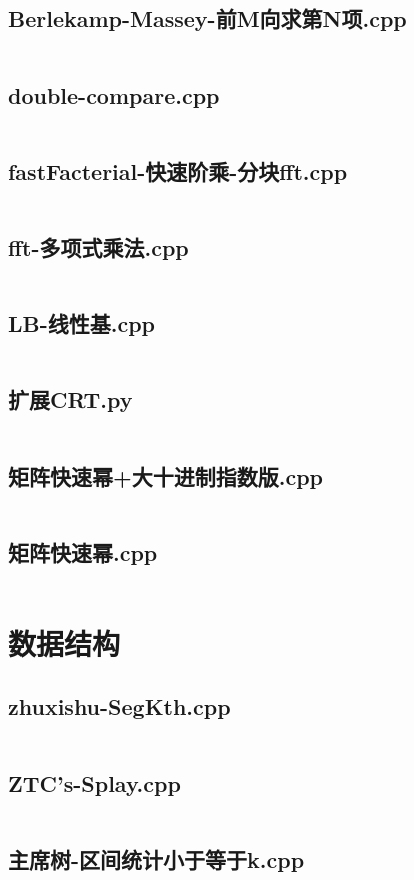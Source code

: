 \documentclass[a4paper,landscape,twocolumn]{article} %
\begin{document}
\subsection{Berlekamp-Massey-前M向求第N项.cpp}
\inputminted{c++}{./codes/030}
\subsection{double-compare.cpp}
\inputminted{c++}{./codes/031}
\subsection{fastFacterial-快速阶乘-分块fft.cpp}
\inputminted{c++}{./codes/032}
\subsection{fft-多项式乘法.cpp}
\inputminted{c++}{./codes/033}
\subsection{LB-线性基.cpp}
\inputminted{c++}{./codes/034}
\subsection{扩展CRT.py}
\inputminted{python}{./codes/035}
\subsection{矩阵快速幂+大十进制指数版.cpp}
\inputminted{c++}{./codes/036}
\subsection{矩阵快速幂.cpp}
\inputminted{c++}{./codes/037}
\section{数据结构}
\subsection{zhuxishu-SegKth.cpp}
\inputminted{c++}{./codes/038}
\subsection{ZTC's-Splay.cpp}
\inputminted{c++}{./codes/039}
\subsection{主席树-区间统计小于等于k.cpp}
\inputminted{c++}{./codes/040}
\end{document}
